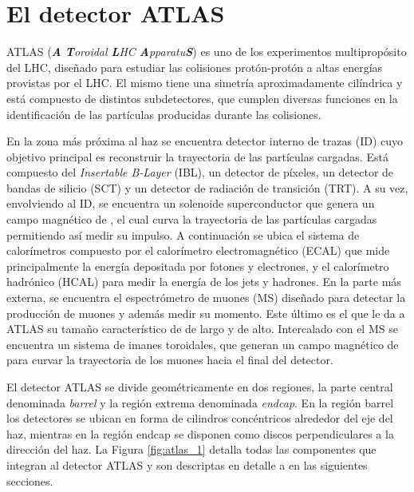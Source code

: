 \section{El detector ATLAS}


ATLAS (\textit{\textbf{A} \textbf{T}oroidal \textbf{L}HC \textbf{A}pparatu\textbf{S}})  \cite{PERF-2007-01} es uno de los experimentos multipropósito del LHC, diseñado para estudiar las colisiones protón-protón a altas energías provistas por el LHC. El mismo tiene una simetría aproximadamente cilíndrica y está compuesto de distintos subdetectores, que cumplen diversas funciones en la identificación de las partículas producidas durante las colisiones. 

En la zona más próxima al haz se encuentra detector interno de trazas (ID) cuyo objetivo principal es reconstruir la trayectoria de las partículas cargadas. Está compuesto del \textit{Insertable B-Layer} (IBL), un detector de píxeles, un detector de bandas de silicio (SCT) y un detector de radiación de transición (TRT). A su vez, envolviendo al ID, se encuentra un solenoide superconductor que genera un campo magnético de , el cual curva la trayectoria de las partículas cargadas permitiendo así medir su impulso. A continuación se ubica el sistema de calorímetros compuesto por el calorímetro electromagnético (ECAL) que mide principalmente la energía depositada por fotones y electrones, y el calorímetro hadrónico (HCAL) para medir la energía de los jets y hadrones. En la parte más externa, se encuentra el espectrómetro de muones (MS) diseñado para detectar la producción de muones y además medir su momento. Este último es el que le da a ATLAS su tamaño característico de  de largo y  de alto. Intercalado con el MS se encuentra un sistema de imanes toroidales, que generan un campo magnético de  para curvar la trayectoria de los muones hacia el final del detector.

El detector ATLAS se divide geométricamente en dos regiones, la parte central denominada \textit{barrel} y la región extrema denominada \textit{endcap}. En la región barrel los detectores se ubican en forma de cilindros concéntricos alrededor del eje del haz, mientras en la región endcap se disponen como discos perpendiculares a la dirección del haz. La Figura \ref{fig:atlas_1} detalla todas las componentes que integran al detector ATLAS y son descriptas en detalle a en las siguientes secciones.


